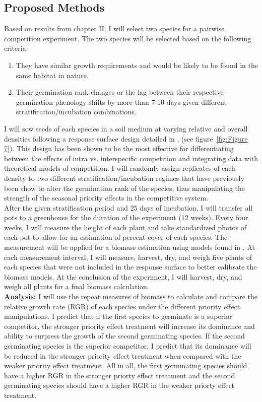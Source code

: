 \documentclass[12pt]{article}\usepackage[]{graphicx}\usepackage[]{color}
\begin{document}
\subsection*{Proposed Methods}
\indent\indent Based on results from chapter II, I will select two species for a pairwise competition experiment. The two species will be selected based on the following criteria:
\begin{enumerate}
\item They have similar growth requirements and would be likely to be found in the same habitat in nature.
\item Their germination rank changes or the lag between their respective germination phenology shifts by more than 7-10 days given different stratification/incubation combinations.
\end{enumerate}
\indent\indent I will sow seeds of each species in a soil medium at varying relative and overall densities following a response surface design detailed in \cite{Inouye2001}, (see figure~\ref{fig:Figure 7}). This design has been shown to be the most effective for differentiating between the effects of intra vs. interspecific competition and integrating data with theoretical models of competition. I will randomly assign replicates of each density to two different stratification/incubation regimes that have previously been show to alter the germination rank of the species, thus manipulating the strength of the seasonal priority effects in the competitive system.\\
\indent After the given stratification period and 25 days of incubation, I will transfer all pots to a greenhouse for the duration of the experiment (12 weeks). Every four weeks, I will measure the height of each plant and take standardized photos of each pot to allow for an estimation of percent cover of each species. The measurement will be applied for a biomass estimation using models found in \citet{Axmanova2012}. At each measurement interval, I will measure, harvest, dry, and weigh five plants of each species that were not included in the response surface to better calibrate the biomass models. At the conclusion of the experiment, I will harvest, dry, and weigh all plants for a final biomass calculation.\\
\indent\textbf{Analysis:} I will use the repeat measures of biomass to calculate and compare the relative growth rate (RGR) \citep{Connolly2005} of each species under the different priority effect manipulations. I predict that if the first species to germinate is a superior competitor, the stronger priority effect treatment will increase its dominance and ability to surpress the growth of the second germinating species. If the second germinating species is the superior competitor, I predict that its dominance will be reduced in the stronger priority effect treatment when compared with the weaker priority effect treatment. All in all, the first germinating species should have a higher RGR in the stronger priorty effect treatment and the second germinating species should have a higher RGR in the weaker priorty effect treatment.\\
\end{document}

